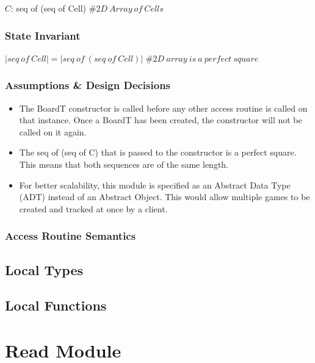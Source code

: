 \documentclass[12pt]{article}
\begin{document}
$C$: seq of (seq of Cell) $\mathit{\# 2D \ Array \ of \ Cells}$

\subsubsection* {State Invariant}

$|seq \ of \ Cell| = |seq \ of \ (seq \ of \ Cell)|$ $\mathit{\# 2D \ array 
\ is \ a \ perfect \ square}$

\subsubsection* {Assumptions \& Design Decisions}

\begin{itemize}

\item The BoardT constructor is called before any other access
  routine is called on that instance. Once a BoardT has been created, the
  constructor will not be called on it again.
  
\item The seq of (seq of C) that is passed to the constructor is a perfect square. This means
that both sequences are of the same length.

\item For better scalability, this module is specified as an Abstract Data Type
  (ADT) instead of an Abstract Object. This would allow multiple games to be
  created and tracked at once by a client.

\end{itemize}

\subsubsection* {Access Routine Semantics}

\subsection*{Local Types}

\subsection*{Local Functions}



\newpage

\section* {Read Module}
\end{document}
